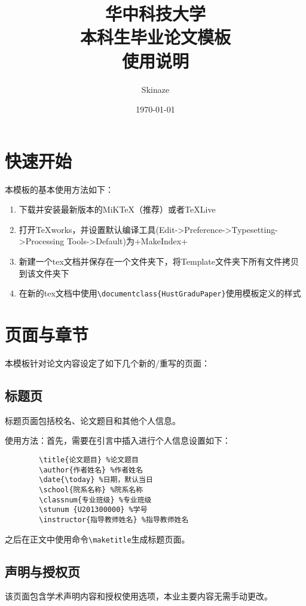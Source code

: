 \documentclass[UTF8]{ctexart}
\title{\bfseries \zihao{2} 华中科技大学\\本科生毕业论文模板\\使用说明}
\author{Skinaze}
\date{\today}
\begin{document}
	\maketitle
	\tableofcontents
	\section{快速开始}
	本模板的基本使用方法如下：
	
	\begin{enumerate}[noitemsep]
		\item 下载并安装最新版本的MiK\TeX （推荐）或者\TeX\space Live\\
		\item 打开\TeX works，并设置默认编译工具(Edit->Preference->Typesetting->Processing Tools->Default)为\XeLaTeX+MakeIndex+\BibTeX\\
		\item 新建一个tex文档并保存在一个文件夹下，将Template文件夹下所有文件拷贝到该文件夹下\\
		\item 在新的tex文档中使用\verb|\documentclass{HustGraduPaper}|使用模板定义的样式
	\end{enumerate}
	
	\section{页面与章节}
	本模板针对论文内容设定了如下几个新的/重写的页面：
	
	\subsection{标题页}
	标题页面包括校名、论文题目和其他个人信息。
	
	使用方法：首先，需要在引言中插入进行个人信息设置如下：
	\begin{verbatim}
		\title{论文题目} %论文题目
		\author{作者姓名} %作者姓名
		\date{\today} %日期，默认当日
		\school{院系名称} %院系名称
		\classnum{专业班级} %专业班级
		\stunum {U201300000} %学号
		\instructor{指导教师姓名} %指导教师姓名
	\end{verbatim}
	之后在正文中使用命令\verb|\maketitle|生成标题页面。
	
	\subsection{声明与授权页}
	该页面包含学术声明内容和授权使用选项，本业主要内容无需手动更改。
	
\end{document}
